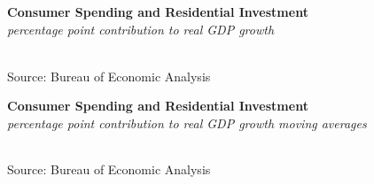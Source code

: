 \documentclass{report}
\makeatletter
\newcommand{\tbllink}[1]{\href{https://raw.githubusercontent.com/bdecon/US-chartbook/master/chartbook/data/#1}{\faTable}}
\newcommand*\short[1]{\expandafter\@gobbletwo\number\numexpr#1\relax}
\newcommand{\sbar}[4]{
		\addplot[ybar stacked, bar width=2.5pt, draw opacity=0, fill=#1] 
			table [x=#2, y=#3, col sep=comma]{#4};}
\newcommand{\stdnode}[3]{\node[below, align=left, shift=({#1,#2})]{#3};}
\newcommand{\dateaxisticks}{
		date coordinates in=x, axis line style={draw=none},
		xmax={2021-06-15},
		max space between ticks=40,	    
		xtick={{1990-01-01}, {1992-01-01}, {1994-01-01}, 
			{1996-01-01}, {1998-01-01}, {2000-01-01}, 
			{2002-01-01}, {2004-01-01}, {2006-01-01},
			{2008-01-01}, {2010-01-01}, {2012-01-01}, {2014-01-01},
		    {2016-01-01}, {2018-01-01}, {2020-01-01}},
		minor xtick={{1989-01-01}, {1991-01-01}, {1993-01-01},
			{1995-01-01}, {1997-01-01}, {1999-01-01}, 
			{2001-01-01}, {2003-01-01}, {2005-01-01}, {2007-01-01},
		    {2009-01-01}, {2011-01-01}, {2013-01-01}, {2015-01-01},
		    {2017-01-01}, {2019-01-01}, {2021-01-01}},
		enlarge y limits={0.06}, enlarge x limits={0.01},
		}
\newcommand{\bbar}[2]{extra #1 ticks = {{#2}}, extra #1 tick labels = ,
		extra #1 tick style = {grid=major, grid style={thick, black!25}},}
\newcommand{\rbars}{
		\fill[color=black!10] (axis cs:{1990-07-01},\pgfkeysvalueof{/pgfplots/ymin}) rectangle 
			(axis cs:{1991-03-01}, \pgfkeysvalueof{/pgfplots/ymax});
		\fill[color=black!10] (axis cs:{2007-12-01},\pgfkeysvalueof{/pgfplots/ymin}) rectangle 
			(axis cs:{2009-07-01}, \pgfkeysvalueof{/pgfplots/ymax});
		\fill[color=black!10] (axis cs:{2001-03-01},\pgfkeysvalueof{/pgfplots/ymin}) rectangle 
			(axis cs:{2001-11-01}, \pgfkeysvalueof{/pgfplots/ymax});
		\fill[color=black!10] (axis cs:{2020-02-01},\pgfkeysvalueof{/pgfplots/ymin}) rectangle 
			(axis cs:{2021-06-15}, \pgfkeysvalueof{/pgfplots/ymax});}
\makeatother
\begin{document}
{\begin{minipage}{0.76\textwidth}
\normalsize \textbf{Consumer Spending and Residential Investment}\\
\footnotesize{\textit{percentage point contribution to real GDP growth}}\\
\hspace*{-2mm} \\
\footnotesize{Source: Bureau of Economic Analysis} \hfill \tbllink{pce.csv}
\vspace{3mm}

\small  
\end{minipage}
\vspace{1mm}

\begin{minipage}{0.80\textwidth}
\normalsize \textbf{Consumer Spending and Residential Investment}\\
\footnotesize{\textit{percentage point contribution to real GDP growth \hspace{36mm} moving averages}}\\
 \setlength{\tabcolsep}{3.0pt} \color{black!90}
	{\renewcommand{\arraystretch}{1.55}
\hspace*{-2mm} \begin{tabular}{p{2.0mm} p{39mm} R{8.2mm} R{8.2mm} R{8.2mm} R{8.2mm} R{7.2mm} 
					R{7.8mm} R{7.2mm} R{7.2mm}}
		 \hline
	\end{tabular}}
	\vspace{-2mm}
	
\footnotesize{Source: Bureau of Economic Analysis}
\end{minipage}
\newpage 
\begin{minipage}{0.76\textwidth}
\small 
\vspace{1mm}


\end{minipage}}
\end{document}
